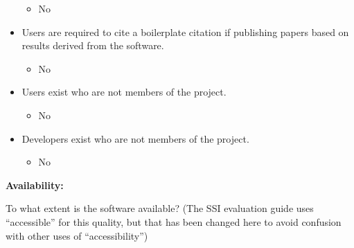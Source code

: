 \begin{itemize}
  \begin{itemize}
  \itemsep1pt\parskip0pt
  \item
    No
  \end{itemize}
\item
  Users are required to cite a boilerplate citation if publishing papers
  based on results derived from the software.

  \begin{itemize}
  \itemsep1pt\parskip0pt
  \item
    No
  \end{itemize}
\item
  Users exist who are not members of the project.

  \begin{itemize}
  \itemsep1pt\parskip0pt
  \item
    No
  \end{itemize}
\item
  Developers exist who are not members of the project.

  \begin{itemize}
  \itemsep1pt\parskip0pt
  \item
    No
  \end{itemize}
\end{itemize}

\textbf{Availability:}

To what extent is the software available? (The SSI evaluation guide uses
``accessible'' for this quality, but that has been changed here to avoid
confusion with other uses of ``accessibility'')

